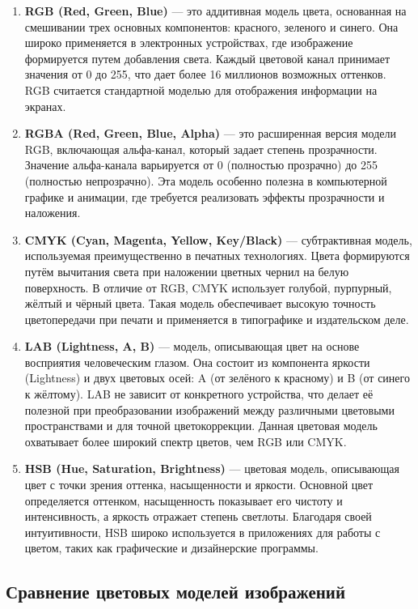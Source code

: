 \begin{enumerate}
    \item \textbf{RGB (Red, Green, Blue)} \cite{RGB} --- это аддитивная модель цвета, основанная на смешивании трех основных компонентов: красного, зеленого и синего. Она широко применяется в электронных устройствах, где изображение формируется путем добавления света. Каждый цветовой канал принимает значения от 0 до 255, что дает более 16 миллионов возможных оттенков. RGB считается стандартной моделью для отображения информации на экранах.
    \item \textbf{RGBA (Red, Green, Blue, Alpha)} \cite{RGB} --- это расширенная версия модели RGB, включающая альфа-канал, который задает степень прозрачности. Значение альфа-канала варьируется от 0 (полностью прозрачно) до 255 (полностью непрозрачно). Эта модель особенно полезна в компьютерной графике и анимации, где требуется реализовать эффекты прозрачности и наложения.
    \item \textbf{CMYK (Cyan, Magenta, Yellow, Key/Black)} \cite{CMYK} --- субтрактивная модель, используемая преимущественно в печатных технологиях. Цвета формируются путём вычитания света при наложении цветных чернил на белую поверхность. В отличие от RGB, CMYK использует голубой, пурпурный, жёлтый и чёрный цвета. Такая модель обеспечивает высокую точность цветопередачи при печати и применяется в типографике и издательском деле.
    \item \textbf{LAB (Lightness, A, B)} \cite{Lab} --- модель, описывающая цвет на основе восприятия человеческим глазом. Она состоит из компонента яркости (Lightness) и двух цветовых осей: A (от зелёного к красному) и B (от синего к жёлтому). LAB не зависит от конкретного устройства, что делает её полезной при преобразовании изображений между различными цветовыми пространствами и для точной цветокоррекции. Данная цветовая модель охватывает более широкий спектр цветов, чем RGB или CMYK.
    \item \textbf{HSB (Hue, Saturation, Brightness)} \cite{HSB} --- цветовая модель, описывающая цвет с точки зрения оттенка, насыщенности и яркости. Основной цвет определяется оттенком, насыщенность показывает его чистоту и интенсивность, а яркость отражает степень светлоты. Благодаря своей интуитивности, HSB широко используется в приложениях для работы с цветом, таких как графические и дизайнерские программы.
\end{enumerate}

\subsection{Сравнение цветовых моделей изображений}

